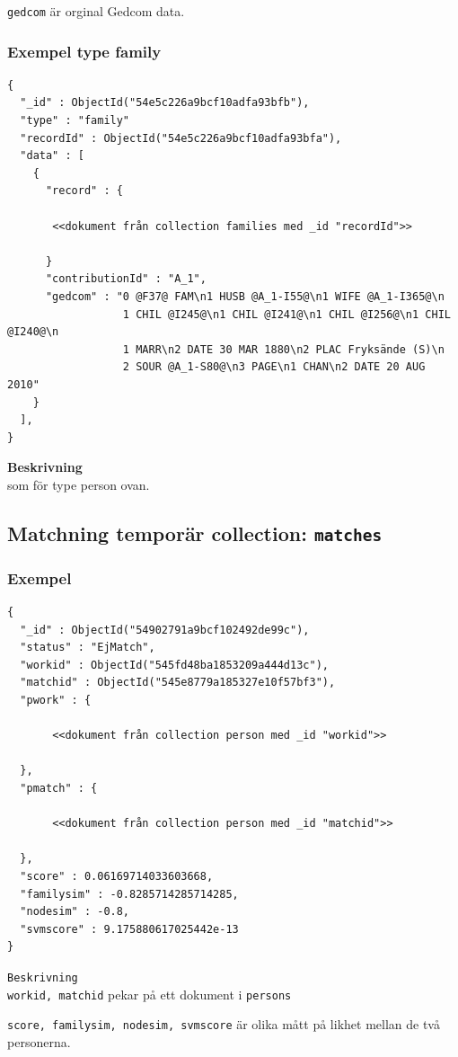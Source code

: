 \documentclass[swedish,11pt]{article}
\begin{document}
\verb+gedcom+ är orginal Gedcom data.

\subsubsection{Exempel type family}
\begin{verbatim}
{
  "_id" : ObjectId("54e5c226a9bcf10adfa93bfb"),
  "type" : "family"
  "recordId" : ObjectId("54e5c226a9bcf10adfa93bfa"),
  "data" : [
    {
      "record" : {

       <<dokument från collection families med _id "recordId">>

      }
      "contributionId" : "A_1",
      "gedcom" : "0 @F37@ FAM\n1 HUSB @A_1-I55@\n1 WIFE @A_1-I365@\n
                  1 CHIL @I245@\n1 CHIL @I241@\n1 CHIL @I256@\n1 CHIL @I240@\n
                  1 MARR\n2 DATE 30 MAR 1880\n2 PLAC Fryksände (S)\n
                  2 SOUR @A_1-S80@\n3 PAGE\n1 CHAN\n2 DATE 20 AUG 2010"
    }
  ],
}
\end{verbatim}
{\bf Beskrivning}\\
som för type person ovan.

\subsection{Matchning temporär collection: \tt matches}
\subsubsection{Exempel}
\begin{verbatim}
{
  "_id" : ObjectId("54902791a9bcf102492de99c"),
  "status" : "EjMatch",
  "workid" : ObjectId("545fd48ba1853209a444d13c"),
  "matchid" : ObjectId("545e8779a185327e10f57bf3"),
  "pwork" : {

       <<dokument från collection person med _id "workid">>

  },
  "pmatch" : {

       <<dokument från collection person med _id "matchid">>

  },
  "score" : 0.06169714033603668,
  "familysim" : -0.8285714285714285,
  "nodesim" : -0.8,
  "svmscore" : 9.175880617025442e-13
}
\end{verbatim}
{\tt Beskrivning}\\
\verb+workid, matchid+ pekar på ett dokument i \verb+persons+

\verb+score, familysim, nodesim, svmscore+ är olika mått på likhet
mellan de två personerna.
\end{document}
